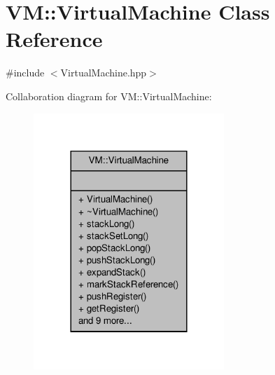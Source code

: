 \hypertarget{class_v_m_1_1_virtual_machine}{\section{V\-M\-:\-:Virtual\-Machine Class Reference}
\label{class_v_m_1_1_virtual_machine}
}


{\ttfamily \#include $<$Virtual\-Machine.\-hpp$>$}



Collaboration diagram for V\-M\-:\-:Virtual\-Machine\-:
\nopagebreak
\begin{figure}[H]
\begin{center}
\leavevmode
\includegraphics[width=204pt]{class_v_m_1_1_virtual_machine__coll__graph}
\end{center}
\end{figure}
